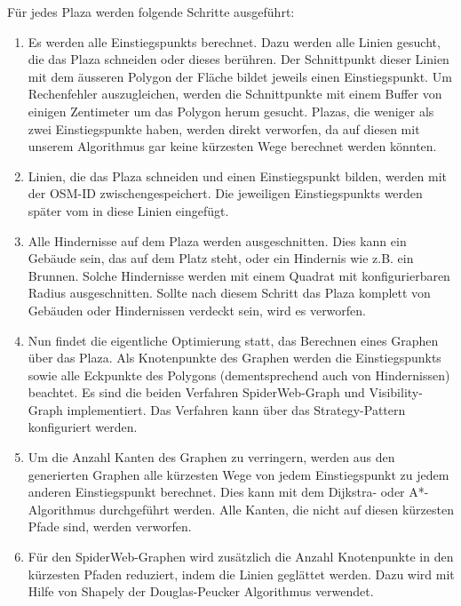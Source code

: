 Für jedes \gls{Plaza} werden folgende Schritte ausgeführt:
\begin{enumerate}
    \item Es werden alle \glspl{Einstiegspunkt} berechnet. Dazu werden alle Linien gesucht, die das Plaza schneiden oder dieses berühren. Der Schnittpunkt dieser Linien mit dem äusseren Polygon der Fläche bildet jeweils einen Einstiegspunkt. Um Rechenfehler auszugleichen, werden die Schnittpunkte mit einem Buffer von einigen Zentimeter um das Polygon herum gesucht. Plazas, die weniger als zwei Einstiegspunkte haben, werden direkt verworfen, da auf diesen mit unserem Algorithmus gar keine kürzesten Wege berechnet werden könnten.
    \item Linien, die das Plaza schneiden und einen \gls{Einstiegspunkt} bilden, werden mit der \ac{OSM}-ID zwischengespeichert. Die jeweiligen \glspl{Einstiegspunkt} werden später vom  in diese Linien eingefügt.
    \item Alle Hindernisse auf dem Plaza werden ausgeschnitten. Dies kann ein Gebäude sein, das auf dem Platz steht, oder ein Hindernis wie z.B. ein Brunnen. Solche Hindernisse werden mit einem Quadrat mit konfigurierbaren Radius ausgeschnitten. Sollte nach diesem Schritt das Plaza komplett von Gebäuden oder Hindernissen verdeckt sein, wird es verworfen.
    \item Nun findet die eigentliche Optimierung statt, das Berechnen eines Graphen über das Plaza. Als Knotenpunkte des Graphen werden die \glspl{Einstiegspunkt} sowie alle Eckpunkte des Polygons (dementsprechend auch von Hindernissen) beachtet. Es sind die beiden Verfahren SpiderWeb-Graph und Visibility-Graph implementiert. Das Verfahren kann über das Strategy-Pattern \cite{gof_patterns} konfiguriert werden.
    \item Um die Anzahl Kanten des Graphen zu verringern, werden aus den generierten Graphen alle kürzesten Wege von jedem Einstiegspunkt zu jedem anderen Einstiegspunkt berechnet. Dies kann mit dem Dijkstra- \cite{dijkstra_algorithm} oder A*-Algorithmus \cite{astar} durchgeführt werden. Alle Kanten, die nicht auf diesen kürzesten Pfade sind, werden verworfen.
    \item Für den SpiderWeb-Graphen wird zusätzlich die Anzahl Knotenpunkte in den kürzesten Pfaden reduziert, indem die Linien geglättet werden. Dazu wird mit Hilfe von Shapely \cite{shapely} der Douglas-Peucker Algorithmus \cite{douglas-peucker_algorithm} verwendet.
\end{enumerate}


